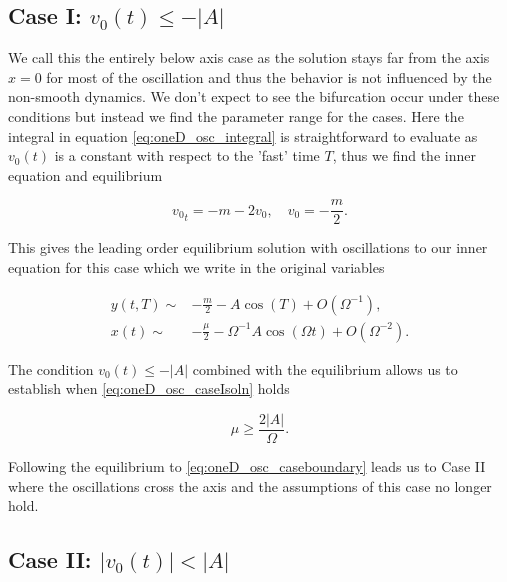 \subsection{Case I: $v_0(t) \le -|A|$}
\label{subsec:oneD_osc_CaseI}

We call this the entirely below axis case as the solution stays far from the axis $x=0$ for most of the oscillation and thus the behavior is not influenced by the non-smooth dynamics. We don't expect to see the bifurcation occur under these conditions but instead we find the parameter range for the cases. Here the integral in equation \eqref{eq:oneD_osc_integral} is straightforward to evaluate as $v_0(t)$ is a constant with respect to the 'fast' time $T$, thus we find the inner equation and equilibrium

\begin{equation*}
{v_0}_t=-m-2v_0,\quad v_0=-\frac{m}{2}.
\end{equation*}

This gives the leading order equilibrium solution with oscillations to our inner equation for this case which we write in the original variables

\begin{equation}\label{eq:oneD_osc_caseIsoln}
\begin{aligned}
y(t,T)\sim& -\frac{m}{2}-A\cos(T)+O(\Omega^{-1}),\\ 
x(t)\sim& -\frac{\mu}{2}-\Omega^{-1} A\cos(\Omega t)+O(\Omega^{-2}).
\end{aligned}
\end{equation}

The condition $v_0(t)\le -|A|$ combined with the equilibrium allows us to establish when \eqref{eq:oneD_osc_caseIsoln} holds

\begin{equation}\label{eq:oneD_osc_caseboundary}
\mu\ge \frac{2|A|}{\Omega}.
\end{equation}

Following the equilibrium to \eqref{eq:oneD_osc_caseboundary} leads us to Case II where the oscillations cross the axis and the assumptions of this case no longer hold.

\subsection{Case II: $|v_0(t)|< |A|$}
\label{subsec:oneD_osc_CaseII}

